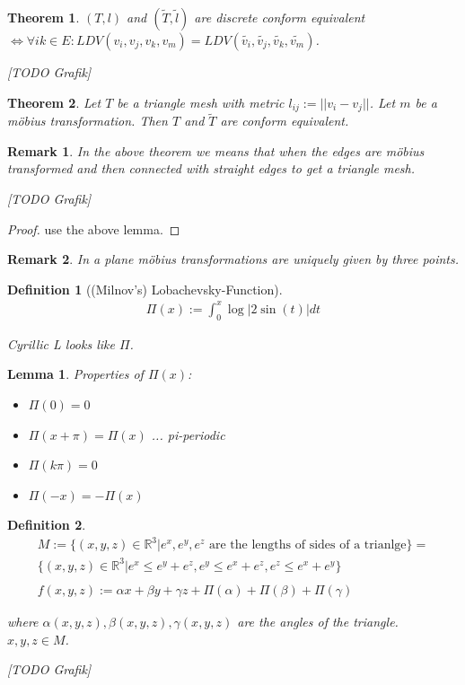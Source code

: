 \documentclass[]{article}
\newtheorem{lemma}{Lemma}
\newtheorem{theorem}{Theorem}
\newtheorem{definition}{Definition}
\newtheorem{remark}{Remark}
\begin{document}
\begin{theorem}
	$(T,l)$ and $(\tilde{T}, \tilde{l})$ are discrete conform equivalent $\iff \forall ik \in E: LDV(v_i, v_j, v_k, v_m) = LDV(\tilde{v_i}, \tilde{v_j}, \tilde{v_k}, \tilde{v_m})$.
	
	[TODO Grafik]
\end{theorem}

\begin{theorem}
	Let $T$ be a triangle mesh with metric $l_{ij} := ||v_i - v_j||$. Let $m$ be a möbius transformation. Then $T$ and $\tilde{T}$ are conform equivalent.
\end{theorem}

\begin{remark}
	In the above theorem we means that when the edges are möbius transformed and then connected with straight edges to get a triangle mesh.
	
	[TODO Grafik]
\end{remark}

\begin{proof}
	use the above lemma.
\end{proof}

\begin{remark}
	In a plane möbius transformations are uniquely given by three points.
\end{remark}

\begin{definition}[(Milnov's) Lobachevsky-Function]
	\begin{align*}
		 \Pi(x) := \int_{0}^{x} \log |2\sin(t)| dt
	\end{align*}
	
	Cyrillic L looks like $\Pi$.
\end{definition}

\begin{lemma}
	Properties of $\Pi(x)$:
	\begin{itemize}
		\item $\Pi(0) = 0$
		\item $\Pi(x+\pi) = \Pi(x)$ ... pi-periodic
		\item $\Pi(k\pi) = 0$
		\item $\Pi(-x) = -\Pi(x)$
	\end{itemize}
\end{lemma}

\begin{definition}
	\begin{align*}
		M := \{(x,y,z) \in \mathbb{R}^3 | e^x, e^y, e^z \text{ are the lengths of sides of a trianlge}\} =\\
		\{(x,y,z) \in \mathbb{R}^3| e^x \leq e^y + e^z, e^y \leq e^x + e^z, e^z \leq e^x + e^y\}\\
		\\
		f(x,y,z) := \alpha x + \beta y + \gamma z + \Pi(\alpha) + \Pi(\beta) + \Pi(\gamma)
	\end{align*}
	
	where $\alpha(x,y,z), \beta(x,y,z), \gamma(x,y,z)$ are the angles of the triangle. $x,y,z \in M$.
	
	[TODO Grafik]
\end{definition}
\end{document}
